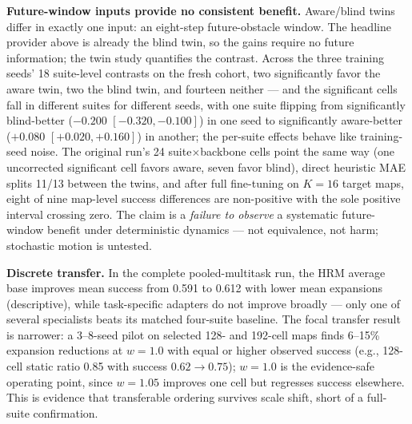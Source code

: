 \documentclass[11pt,letterpaper]{article}
\begin{document}
\textbf{Future-window inputs provide no consistent benefit.} Aware/blind twins differ in exactly one input: an eight-step future-obstacle window. The headline provider above is already the blind twin, so the gains require no future information; the twin study quantifies the contrast. Across the three training seeds' 18 suite-level contrasts on the fresh cohort, two significantly favor the aware twin, two the blind twin, and fourteen neither --- and the significant cells fall in different suites for different seeds, with one suite flipping from significantly blind-better ($-0.200$ $[-0.320,-0.100]$) in one seed to significantly aware-better ($+0.080$ $[+0.020,+0.160]$) in another; the per-suite effects behave like training-seed noise. The original run's 24 suite$\times$backbone cells point the same way (one uncorrected significant cell favors aware, seven favor blind), direct heuristic MAE splits 11/13 between the twins, and after full fine-tuning on $K{=}16$ target maps, eight of nine map-level success differences are non-positive with the sole positive interval crossing zero. The claim is a \emph{failure to observe} a systematic future-window benefit under deterministic dynamics --- not equivalence, not harm; stochastic motion is untested.

\textbf{Discrete transfer.} In the complete pooled-multitask run, the HRM average base improves mean success from 0.591 to 0.612 with lower mean expansions (descriptive), while task-specific adapters do not improve broadly --- only one of several specialists beats its matched four-suite baseline. The focal transfer result is narrower: a 3--8-seed pilot on selected 128- and 192-cell maps finds 6--15\% expansion reductions at $w{=}1.0$ with equal or higher observed success (e.g., 128-cell static ratio 0.85 with success $0.62 \to 0.75$); $w{=}1.0$ is the evidence-safe operating point, since $w{=}1.05$ improves one cell but regresses success elsewhere. This is evidence that transferable ordering survives scale shift, short of a full-suite confirmation.
\end{document}
